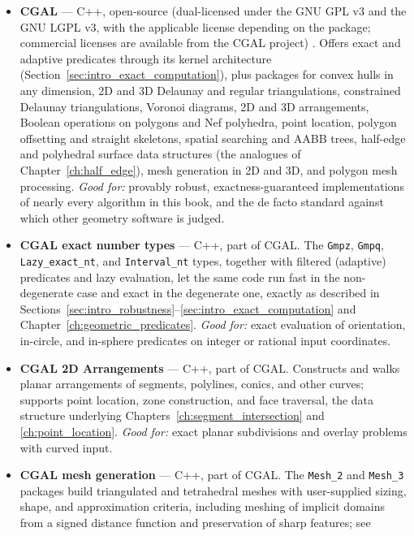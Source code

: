 \begin{itemize}
  \item \textbf{CGAL} --- C++, open-source (dual-licensed under the GNU
    GPL v3 and the GNU LGPL v3, with the applicable license depending on
    the package; commercial licenses are available from the CGAL
    project) \cite{cgalmanual}. Offers exact and adaptive predicates
    through its kernel architecture (Section~\ref{sec:intro_exact_computation}),
    plus packages for convex hulls in any dimension, 2D and 3D Delaunay
    and regular triangulations, constrained Delaunay triangulations,
    Voronoi diagrams, 2D and 3D arrangements, Boolean operations on
    polygons and Nef polyhedra, point location, polygon offsetting and
    straight skeletons, spatial searching and AABB trees, half-edge and
    polyhedral surface data structures (the analogues of
    Chapter~\ref{ch:half_edge}), mesh generation in 2D and 3D, and
    polygon mesh processing. \emph{Good for:} provably robust,
    exactness-guaranteed implementations of nearly every algorithm in
    this book, and the de facto standard against which other geometry
    software is judged.
  \item \textbf{CGAL exact number types} --- C++, part of CGAL. The
    \texttt{Gmpz}, \texttt{Gmpq}, \texttt{Lazy\_exact\_nt}, and
    \texttt{Interval\_nt} types, together with filtered (adaptive)
    predicates and lazy evaluation, let the same code run fast in the
    non-degenerate case and exact in the degenerate one, exactly as
    described in Sections~\ref{sec:intro_robustness}--\ref{sec:intro_exact_computation}
    and Chapter~\ref{ch:geometric_predicates}. \emph{Good for:} exact
    evaluation of orientation, in-circle, and in-sphere predicates on
    integer or rational input coordinates.
  \item \textbf{CGAL 2D Arrangements} --- C++, part of CGAL. Constructs
    and walks planar arrangements of segments, polylines, conics, and
    other curves; supports point location, zone construction, and face
    traversal, the data structure underlying
    Chapters~\ref{ch:segment_intersection} and \ref{ch:point_location}.
    \emph{Good for:} exact planar subdivisions and overlay problems with
    curved input.
  \item \textbf{CGAL mesh generation} --- C++, part of CGAL. The
    \texttt{Mesh\_2} and \texttt{Mesh\_3} packages build triangulated
    and tetrahedral meshes with user-supplied sizing, shape, and
    approximation criteria, including meshing of implicit domains from a
    signed distance function and preservation of sharp features; see

\end{itemize}
